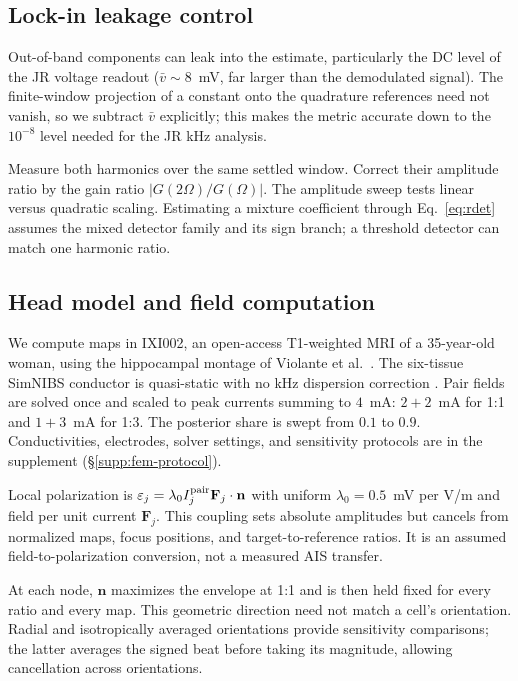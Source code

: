 \documentclass[11pt,a4paper]{article}
\newif\ifjne
\providecommand{\DIFaddend}{} %
\begin{document}
\DIFaddend \ifjne\else
\subsection{Lock-in leakage control}\label{supp:lockin}
Out-of-band components can leak into the estimate, particularly the DC level of the JR voltage readout ($\bar v\!\sim\!8$~mV, far
larger than the demodulated signal). The finite-window projection of a constant onto the quadrature references
need not vanish, so we subtract $\bar v$ explicitly; this makes the metric
accurate down to the $10^{-8}$ level needed for the JR kHz
analysis.

\fi

Measure both harmonics over the same settled window. Correct their amplitude
ratio by the gain ratio $|G(2\Omega)/G(\Omega)|$. The amplitude sweep tests
linear versus quadratic scaling. Estimating a mixture coefficient through
Eq.~\eqref{eq:rdet} assumes the mixed detector family and its
sign branch; a threshold detector can match one harmonic ratio.

\subsection{Head model and field computation}\label{sec:fem-methods}
\ifjne
We compute maps in IXI002, an open-access T1-weighted MRI of a 35-year-old
woman, using the hippocampal montage of Violante et al.\ \cite{violante2023}.
The six-tissue SimNIBS conductor is quasi-static with no kHz dispersion correction
\cite{salvador2025}. Pair fields are solved once and scaled to peak currents
summing to $4$~mA: $2+2$~mA for 1:1 and $1+3$~mA for 1:3. The posterior share
is swept from $0.1$ to $0.9$. Conductivities, electrodes, solver settings,
and sensitivity protocols are in the supplement (\S\ref{supp:fem-protocol}).

Local polarization is $\varepsilon_j=\lambda_0 I_j^{\rm pair}\mathbf F_j\cdot\mathbf n$
with uniform $\lambda_0=0.5$~mV per V/m \cite{radman2009} and field per unit
current $\mathbf F_j$. This coupling sets absolute amplitudes but cancels from
normalized maps, focus positions, and target-to-reference ratios. It is an
assumed field-to-polarization conversion, not a measured AIS transfer.

At each node, $\mathbf n$ maximizes the envelope at 1:1 and is then held fixed
for every ratio and every map. This geometric direction need not match a cell's
orientation. Radial and isotropically averaged orientations provide sensitivity
comparisons; the latter averages the signed beat before taking its magnitude,
allowing cancellation across orientations.
\end{document}
